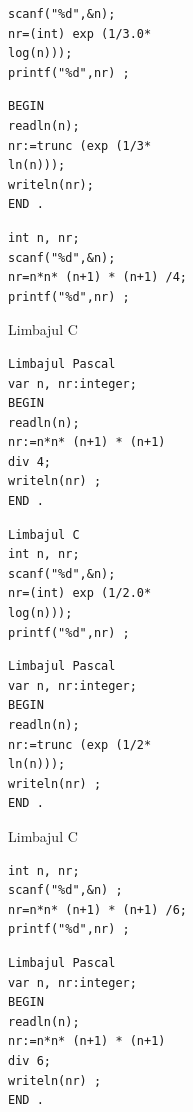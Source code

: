 \documentclass[10pt]{article}
\begin{document}
\begin{verbatim}
scanf("%d",&n);
nr=(int) exp (1/3.0*
log(n)));
printf("%d",nr) ;
\end{verbatim}

\begin{verbatim}
BEGIN
readln(n);
nr:=trunc (exp (1/3*
ln(n)));
writeln(nr);
END .
\end{verbatim}

\begin{verbatim}
int n, nr;
scanf("%d",&n);
nr=n*n* (n+1) * (n+1) /4;
printf("%d",nr) ;
\end{verbatim}

Limbajul C

\begin{verbatim}
Limbajul Pascal
var n, nr:integer;
BEGIN
readln(n);
nr:=n*n* (n+1) * (n+1)
div 4;
writeln(nr) ;
END .
\end{verbatim}

\begin{verbatim}
Limbajul C
int n, nr;
scanf("%d",&n);
nr=(int) exp (1/2.0*
log(n)));
printf("%d",nr) ;
\end{verbatim}

\begin{verbatim}
Limbajul Pascal
var n, nr:integer;
BEGIN
readln(n);
nr:=trunc (exp (1/2*
ln(n)));
writeln(nr) ;
END .
\end{verbatim}

Limbajul C

\begin{verbatim}
int n, nr;
scanf("%d",&n) ;
nr=n*n* (n+1) * (n+1) /6;
printf("%d",nr) ;
\end{verbatim}

\begin{verbatim}
Limbajul Pascal
var n, nr:integer;
BEGIN
readln(n);
nr:=n*n* (n+1) * (n+1)
div 6;
writeln(nr) ;
END .
\end{verbatim}
\end{document}
